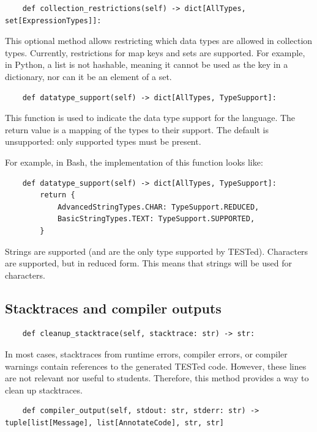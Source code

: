\documentclass[../main]{subfiles}
\begin{document}
\begin{verbatim}
    def collection_restrictions(self) -> dict[AllTypes, set[ExpressionTypes]]:
\end{verbatim}

This optional method allows restricting which data types are allowed in collection types.
Currently, restrictions for map keys and sets are supported.
For example, in Python, a list is not hashable, meaning it cannot be used as the key in a dictionary, nor can it be an element of a set.

\begin{verbatim}
    def datatype_support(self) -> dict[AllTypes, TypeSupport]:
\end{verbatim}

This function is used to indicate the data type support for the language.
The return value is a mapping of the types to their support.
The default is unsupported: only supported types must be present.

For example, in Bash, the implementation of this function looks like:

\begin{verbatim}
    def datatype_support(self) -> dict[AllTypes, TypeSupport]:
        return {
            AdvancedStringTypes.CHAR: TypeSupport.REDUCED,
            BasicStringTypes.TEXT: TypeSupport.SUPPORTED,
        }
\end{verbatim}

Strings are supported (and are the only type supported by TESTed).
Characters are supported, but in reduced form.
This means that strings will be used for characters.

\subsection{Stacktraces and compiler outputs}\label{subsec:error-messages-and-compiler-outputs}

\begin{verbatim}
    def cleanup_stacktrace(self, stacktrace: str) -> str:
\end{verbatim}

In most cases, stacktraces from runtime errors, compiler errors, or compiler warnings contain references to the generated TESTed code.
However, these lines are not relevant nor useful to students.
Therefore, this method provides a way to clean up stacktraces.

\begin{verbatim}
    def compiler_output(self, stdout: str, stderr: str) -> tuple[list[Message], list[AnnotateCode], str, str]
\end{verbatim}
\end{document}

